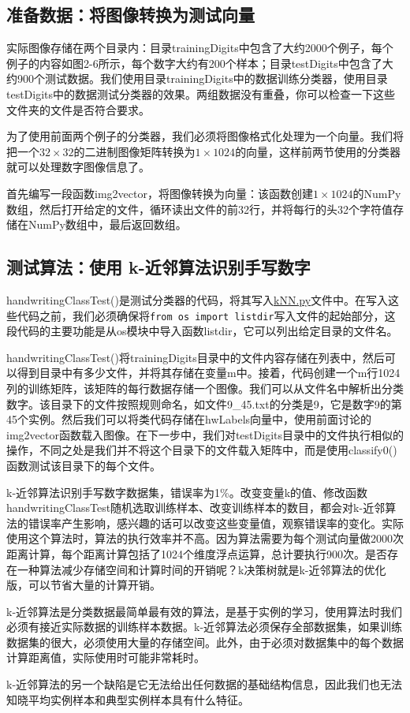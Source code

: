 \subsection{准备数据：将图像转换为测试向量}
实际图像存储在两个目录内：目录trainingDigits中包含了大约2000个例子，每个例子的内容如图2-6所示，每个数字大约有200个样本；目录testDigits中包含了大约900个测试数据。我们使用目录trainingDigits中的数据训练分类器，使用目录testDigits中的数据测试分类器的效果。两组数据没有重叠，你可以检查一下这些文件夹的文件是否符合要求。

为了使用前面两个例子的分类器，我们必须将图像格式化处理为一个向量。我们将把一个$32\times32$的二进制图像矩阵转换为$1\times1024$的向量，这样前两节使用的分类器就可以处理数字图像信息了。

首先编写一段函数img2vector，将图像转换为向量：该函数创建$1\times1024$的NumPy数组，然后打开给定的文件，循环读出文件的前32行，并将每行的头32个字符值存储在NumPy数组中，最后返回数组。

\subsection{测试算法：使用 k-近邻算法识别手写数字}

handwritingClassTest()是测试分类器的代码，将其写入\href{https://github.com/JPL-JUNO/Machine-Learning-in-Action/blob/main/Codes/kNN.py}{kNN.py}文件中。在写入这些代码之前，我们必须确保将\verb|from os import listdir|写入文件的起始部分，这段代码的主要功能是从os模块中导入函数listdir，它可以列出给定目录的文件名。

handwritingClassTest()将trainingDigits目录中的文件内容存储在列表中，然后可以得到目录中有多少文件，并将其存储在变量m中。接着，代码创建一个m行1024列的训练矩阵，该矩阵的每行数据存储一个图像。我们可以从文件名中解析出分类数字。该目录下的文件按照规则命名，如文件9\_45.txt的分类是9，它是数字9的第45个实例。然后我们可以将类代码存储在hwLabels向量中，使用前面讨论的img2vector函数载入图像。在下一步中，我们对testDigits目录中的文件执行相似的操作，不同之处是我们并不将这个目录下的文件载入矩阵中，而是使用classify0()函数测试该目录下的每个文件。

k-近邻算法识别手写数字数据集，错误率为1\%。改变变量k的值、修改函数handwritingClassTest随机选取训练样本、改变训练样本的数目，都会对k-近邻算法的错误率产生影响，感兴趣的话可以改变这些变量值，观察错误率的变化。实际使用这个算法时，算法的执行效率并不高。因为算法需要为每个测试向量做2000次距离计算，每个距离计算包括了1024个维度浮点运算，总计要执行900次。是否存在一种算法减少存储空间和计算时间的开销呢？k决策树就是k-近邻算法的优化版，可以节省大量的计算开销。

k-近邻算法是分类数据最简单最有效的算法，是基于实例的学习，使用算法时我们必须有接近实际数据的训练样本数据。k-近邻算法必须保存全部数据集，如果训练数据集的很大，必须使用大量的存储空间。此外，由于必须对数据集中的每个数据计算距离值，实际使用时可能非常耗时。

k-近邻算法的另一个缺陷是它无法给出任何数据的基础结构信息，因此我们也无法知晓平均实例样本和典型实例样本具有什么特征。